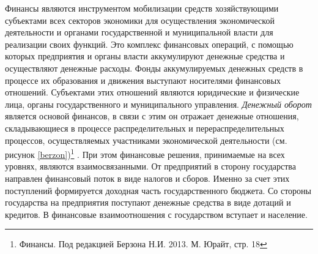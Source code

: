 \documentclass[a4paper,12pt,fleqn]{article} %
\begin{document}
Финансы являются инструментом мобилизации средств хозяйствующими субъектами всех секторов экономики для осуществления экономической деятельности и органами государственной и муниципальной власти для реализации своих функций. Это комплекс финансовых операций, с помощью которых предприятия и органы власти аккумулируют денежные средства и осуществляют денежные расходы. Фонды аккумулируемых денежных средств в процессе их образования и движения выступают носителями финансовых отношений. Субъектами этих отношений являются юридические и физические лица, органы государственного и муниципального управления. \textit{Денежный оборот} является основой финансов, в связи с этим он отражает денежные отношения, складывающиеся в процессе распределительных и перераспределительных процессов, осуществляемых участниками экономической деятельности (см. рисунок \ref{berzon})\footnote{Финансы. Под редакцией Берзона Н.И. 2013. М. Юрайт, стр. 18} . При этом финансовые решения, принимаемые на всех уровнях, являются взаимосвязанными. От предприятий в сторону государства направлен финансовый поток в виде налогов и сборов. Именно за счет этих поступлений формируется доходная часть государственного бюджета. Со стороны государства на предприятия поступают денежные средства в виде дотаций и кредитов. В финансовые взаимоотношения с государством вступает и население. \\[-1.7cm]
\end{document}
